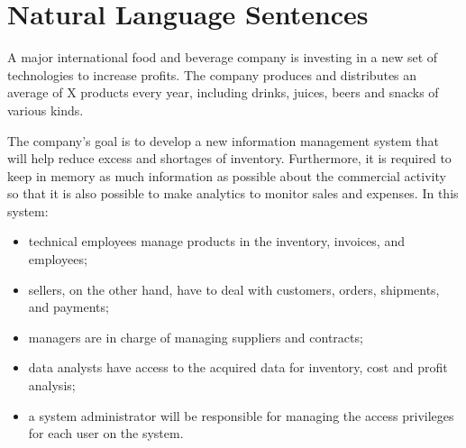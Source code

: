 \section{Natural Language Sentences}

A major international food and beverage company is investing in a new set of technologies to increase profits.
The company produces and distributes an average of X products every year, including drinks, juices, beers and snacks of various kinds.

The company's goal is to develop a new information management system that will help reduce excess and shortages of inventory. Furthermore, it is required to keep in memory as much information as possible about the commercial activity so that it is also possible to make analytics to monitor sales and expenses. In this system:
\begin{itemize}
    \item technical employees manage products in the inventory, invoices, and employees;
    \item sellers, on the other hand, have to deal with customers, orders, shipments, and payments;
    \item managers are in charge of managing suppliers and contracts;
    \item data analysts have access to the acquired data for inventory, cost and profit analysis;
    \item a system administrator will be responsible for managing the access privileges for each user on the system.
\end{itemize}

